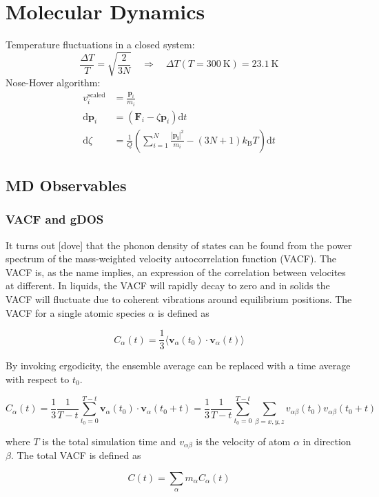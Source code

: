 \section{Molecular Dynamics}
Temperature fluctuations in a closed system:
%
\[ \frac{\Delta T}{T} = \sqrt{\frac{2}{3N}} \quad \Rightarrow \quad \Delta T(T=\SI{300}{\kelvin}) = \SI{23.1}{\kelvin} \]
%
Nose-Hover algorithm:
%
\begin{align*}
v_i^\text{scaled} &= \frac{\bm{p}_i}{m_i} \\
\text{d}\bm{p}_i &= (\bm{F}_i - \zeta \bm{p}_i) \text{d}t \\
\text{d}\zeta &= \frac{1}{Q} \left( \sum_{i=1}^N \frac{|\bm{p_i}|^2}{m_i} - (3N+1)k_\text{B}T\right) \text{d}t
\end{align*}

\subsection{MD Observables}

\subsubsection{VACF and gDOS}
It turns out [dove] that the phonon density of states can be found from the power spectrum of the mass-weighted velocity autocorrelation function (VACF). The VACF is, as the name implies, an expression of the correlation between velocites at different. In liquids, the VACF will rapidly decay to zero and in solids the VACF will fluctuate due to coherent vibrations around equilibrium positions. The VACF for a single atomic species $\alpha$ is defined as

\[ C_\alpha(t) = \frac{1}{3} \langle \bm{v}_\alpha(t_0) \cdot \bm{v}_\alpha(t) \rangle \]

\noindent By invoking ergodicity, the ensemble average can be replaced with a time average with respect to $t_0$.

\[ C_\alpha(t) = \frac{1}{3} \frac{1}{T-t} \sum_{t_0=0}^{T-t} \bm{v}_\alpha(t_0) \cdot \bm{v}_\alpha(t_0 + t) = \frac{1}{3} \frac{1}{T-t} \sum_{t_0=0}^{T-t} \sum_{\beta=x,y,z} v_{\alpha\beta}(t_0) v_{\alpha\beta}(t_0 + t) \]

\noindent where $T$ is the total simulation time and $v_{\alpha\beta}$ is the velocity of atom $\alpha$ in direction $\beta$. The total VACF is defined as

\[ C(t) = \sum_\alpha m_\alpha C_\alpha(t) \]


